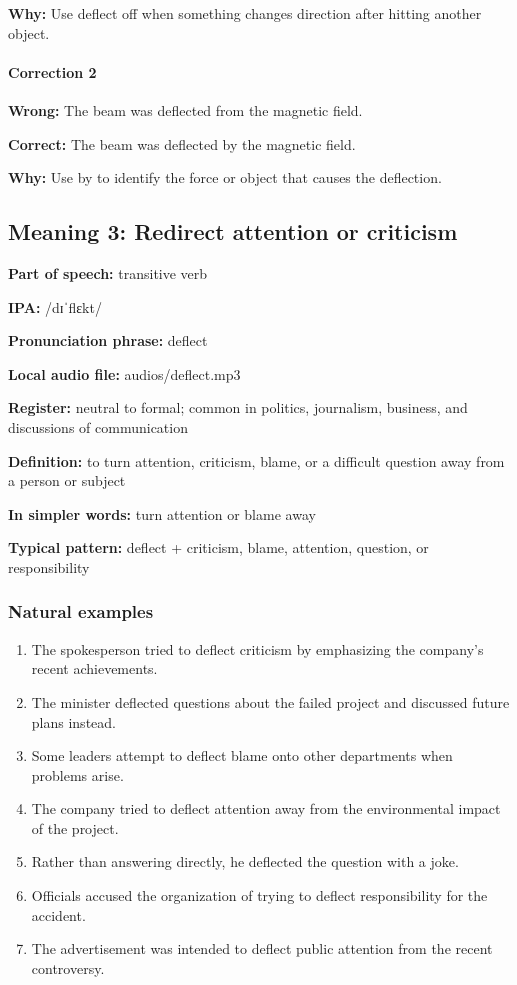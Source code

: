 \documentclass[11pt]{article}
\begin{document}
\textbf{Why:} Use deflect off when something changes direction after hitting another object.

\paragraph{Correction 2}
\textbf{Wrong:} The beam was deflected from the magnetic field.

\textbf{Correct:} The beam was deflected by the magnetic field.

\textbf{Why:} Use by to identify the force or object that causes the deflection.

\subsection{Meaning 3: Redirect attention or criticism}
\textbf{Part of speech:} transitive verb

\textbf{IPA:} /dɪˈflɛkt/

\textbf{Pronunciation phrase:} deflect

\textbf{Local audio file:} audios/deflect.mp3

\textbf{Register:} neutral to formal; common in politics, journalism, business, and discussions of communication

\textbf{Definition:} to turn attention, criticism, blame, or a difficult question away from a person or subject

\textbf{In simpler words:} turn attention or blame away

\textbf{Typical pattern:} deflect + criticism, blame, attention, question, or responsibility

\subsubsection{Natural examples}
\begin{enumerate}
  \item The spokesperson tried to deflect criticism by emphasizing the company's recent achievements.
  \item The minister deflected questions about the failed project and discussed future plans instead.
  \item Some leaders attempt to deflect blame onto other departments when problems arise.
  \item The company tried to deflect attention away from the environmental impact of the project.
  \item Rather than answering directly, he deflected the question with a joke.
  \item Officials accused the organization of trying to deflect responsibility for the accident.
  \item The advertisement was intended to deflect public attention from the recent controversy.
\end{enumerate}
\end{document}
